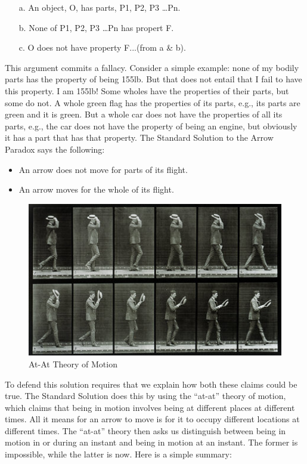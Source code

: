 \documentclass[oneside]{article}
\begin{document}
\begin{enumerate}
\item[a.] An object, O, has parts, P1, P2, P3 \ldots{Pn}.
\item[b.] None of P1, P2, P3 \ldots{Pn} has propert F. 
\item[c.] O does not have property F...(from a \& b). 
\end{enumerate}
This argument commits a fallacy. Consider a simple example: none of my bodily parts has the property of being 155lb. But that does not entail that I fail to have this property. I am 155lb! Some wholes have the properties of their parts, but some do not. A whole green flag has the properties of its parts, e.g., its parts are green and it is green. But a whole car does not have the properties of all its parts, e.g., the car does not have the property of being an engine, but obviously it has a part that has that property. The Standard Solution to the Arrow Paradox says the following: 
\begin{itemize}
\item An arrow does not move for parts of its flight. 
\item An arrow moves for the whole of its flight. 
\end{itemize}
\begin{figure}[h]
  \includegraphics[width=\linewidth]{motion.jpg}
  \caption{At-At Theory of Motion}
\end{figure}
To defend this solution requires that we explain how both these claims could be true. The Standard Solution does this by using  the ``at-at'' theory of motion, which claims that being in motion involves being at different places at different times. All it means for an arrow to move is for it to occupy different locations at different times. The ``at-at'' theory then asks us distinguish between being in motion in or during an instant and   being in motion at an instant. The former is impossible, while the latter is now. Here is a simple summary: 
\end{document}
